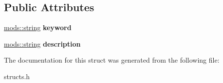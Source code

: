 \subsection*{Public Attributes}
\begin{DoxyCompactItemize}
\item 
\mbox{\label{structextra__descr__data_ad97c021e5d865edf7409f869314566a8}} 
\hyperlink{structmods_1_1string}{mods\+::string} {\bfseries keyword}
\item 
\mbox{\label{structextra__descr__data_a6f32b4cd16344cf6cc46bca38244e385}} 
\hyperlink{structmods_1_1string}{mods\+::string} {\bfseries description}
\end{DoxyCompactItemize}


The documentation for this struct was generated from the following file\+:\begin{DoxyCompactItemize}
\item 
structs.\+h\end{DoxyCompactItemize}

